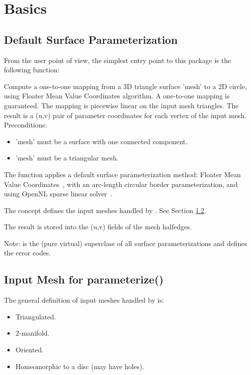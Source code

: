 \section{Basics}


\subsection{Default Surface Parameterization}

From the user point of view, the simplest entry point to this package
is the following function:

{
Compute a one-to-one mapping from a 3D triangle surface 'mesh' to a 2D circle, using Floater Mean Value Coordinates algorithm. A one-to-one mapping is guaranteed.
The mapping is piecewise linear on the input mesh triangles. The result is a (u,v) pair of parameter coordinates for each vertex of the input mesh.
Preconditions:\begin{itemize}
\item 'mesh' must be a surface with one connected component.\item 'mesh' must be a triangular mesh.\end{itemize}
}

The  function applies a default surface parameterization
method: Floater Mean Value Coordinates~\cite{cgal:f-mvc-03}, with an
arc-length circular border parameterization, and using OpenNL sparse
linear solver~\cite{cgal:l-nmdgp-05}.

The  concept defines the input meshes handled
by . See Section \ref{sec:Input-Mesh-for-parameterize}.

The result is stored into the (u,v) fields of the mesh halfedges.

Note:  is the (pure virtual)
superclass of all surface parameterizations and defines the error codes.


\subsection{Input Mesh for parameterize()}
\label{sec:Input-Mesh-for-parameterize}

The general definition of input meshes handled by  is:

\begin{itemize}

\item Triangulated.

\item 2-manifold.

\item Oriented.

\item Homeomorphic to a disc (may have holes).

\end{itemize}

